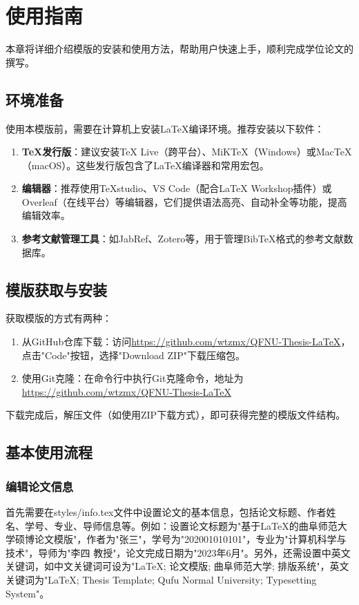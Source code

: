 \section{使用指南}

本章将详细介绍模版的安装和使用方法，帮助用户快速上手，顺利完成学位论文的撰写。

\subsection{环境准备}
使用本模版前，需要在计算机上安装\LaTeX{}编译环境。推荐安装以下软件：

\begin{enumerate}
    \item \textbf{\TeX{}发行版}：建议安装TeX Live（跨平台）、MiKTeX（Windows）或MacTeX（macOS）。这些发行版包含了\LaTeX{}编译器和常用宏包。
    \item \textbf{编辑器}：推荐使用TeXstudio、VS Code（配合LaTeX Workshop插件）或Overleaf（在线平台）等编辑器，它们提供语法高亮、自动补全等功能，提高编辑效率。
    \item \textbf{参考文献管理工具}：如JabRef、Zotero等，用于管理BibTeX格式的参考文献数据库。
\end{enumerate}

\subsection{模版获取与安装}
获取模版的方式有两种：
\begin{enumerate}
    \item 从GitHub仓库下载：访问\url{https://github.com/wtzmx/QFNU-Thesis-LaTeX}，点击"Code"按钮，选择"Download ZIP"下载压缩包。
    \item 使用Git克隆：在命令行中执行Git克隆命令，地址为 \url{https://github.com/wtzmx/QFNU-Thesis-LaTeX}
\end{enumerate}

下载完成后，解压文件（如使用ZIP下载方式），即可获得完整的模版文件结构。

\subsection{基本使用流程}

\subsubsection{编辑论文信息}
首先需要在styles/info.tex文件中设置论文的基本信息，包括论文标题、作者姓名、学号、专业、导师信息等。例如：设置论文标题为"基于LaTeX的曲阜师范大学硕博论文模版"，作者为"张三"，学号为"202001010101"，专业为"计算机科学与技术"，导师为"李四 教授"，论文完成日期为"2023年6月"。另外，还需设置中英文关键词，如中文关键词可设为"LaTeX; 论文模版; 曲阜师范大学; 排版系统"，英文关键词为"LaTeX; Thesis Template; Qufu Normal University; Typesetting System"。

